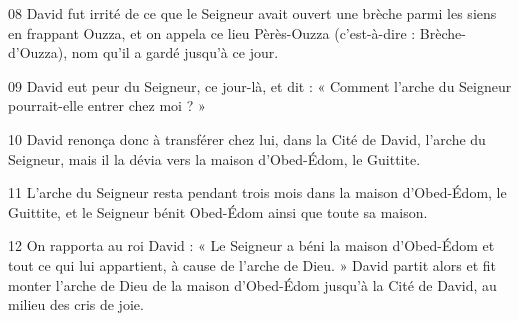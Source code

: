 
08 David fut irrité de ce que le Seigneur avait ouvert une brèche parmi les siens en frappant Ouzza, et on appela ce lieu Pèrès-Ouzza (c’est-à-dire : Brèche-d’Ouzza), nom qu’il a gardé jusqu’à ce jour.

09 David eut peur du Seigneur, ce jour-là, et dit : « Comment l’arche du Seigneur pourrait-elle entrer chez moi ? »

10 David renonça donc à transférer chez lui, dans la Cité de David, l’arche du Seigneur, mais il la dévia vers la maison d’Obed-Édom, le Guittite.

11 L’arche du Seigneur resta pendant trois mois dans la maison d’Obed-Édom, le Guittite, et le Seigneur bénit Obed-Édom ainsi que toute sa maison.

12 On rapporta au roi David : « Le Seigneur a béni la maison d’Obed-Édom et tout ce qui lui appartient, à cause de l’arche de Dieu. » David partit alors et fit monter l’arche de Dieu de la maison d’Obed-Édom jusqu’à la Cité de David, au milieu des cris de joie.